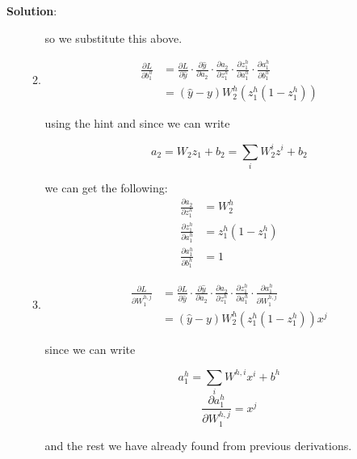 \documentclass[submit]{../harvardml}
\newenvironment{answer}{
    \vspace{2mm}
    \color{blue}\noindent\textbf{Solution}:
}{}
\begin{document}
\begin{answer}
\begin{enumerate}
\begin{enumerate}
                  so we substitute this above.

            \item
                  \begin{align*}
                    \frac {\partial L}{\partial b_1^h} & = \frac{\partial L}{\partial \hat{y}}\cdot \frac{\partial\hat{y}}{\partial a_2}\cdot \frac{\partial a_2}{\partial z_1^h} \cdot \frac{\partial z_1^h}{\partial a_1^h} \cdot \frac{\partial a_1^h}{\partial b_1^h} \\
                    &= \boxed{(\hat{y} - y)W_2^h(z_1^h(1-z_1^h))}
                  \end{align*}

                  using the hint and since we can write

                  \[
                  a_2 = W_2 z_1 + b_2 = \sum_{i}W_2^iz^i + b_2
                  \]

                  we can get the following:
                  \begin{align*}
                      \frac{\partial a_2}{\partial z_1^h} &= W_2^h \\
                      \frac{\partial z_1^h}{\partial a_1^h} &= z_1^h(1-z_1^h) \\
                      \frac{\partial a_1^h}{\partial b_1^h} &= 1
                  \end{align*}

            \item
                  \begin{align*}
                    \frac {\partial L}{\partial W_1^{h,j}} & = \frac{\partial L}{\partial \hat{y}}\cdot \frac{\partial\hat{y}}{\partial a_2}\cdot \frac{\partial a_2}{\partial z_1^h} \cdot \frac{\partial z_1^h}{\partial a_1^h} \cdot \frac{\partial a_1^h}{\partial W_1^{h,j}} \\
                    &= \boxed{(\hat{y} - y)W_2^h(z_1^h(1-z_1^h))x^j}
                  \end{align*}

                  since we can write

                  \[
                  a_1^h = \sum_{i}W^{h,i}x^i + b^h
                  \]
                  \[
                  \frac{\partial a_1^h}{\partial W_1^{h,j}} = x^j
                  \]

                  and the rest we have already found from previous derivations.
          \end{enumerate}


\end{enumerate}
\end{answer}
\end{document}
